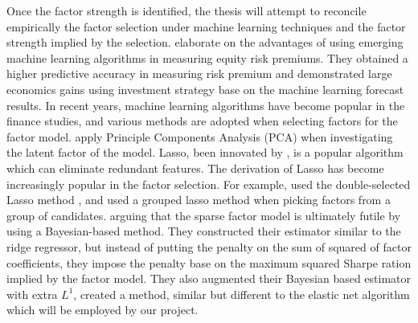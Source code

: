 Once the factor strength is identified, the thesis will attempt to reconcile empirically the factor selection under machine learning techniques and the factor strength implied by the selection.
 elaborate on the advantages of using emerging machine learning algorithms in measuring equity risk premiums.
They obtained a higher predictive accuracy in measuring risk premium and demonstrated large economics gains using investment strategy base on the machine learning forecast results.
In recent years, machine learning algorithms have become popular in the finance studies, and various methods are adopted when selecting factors for the factor model.
 apply Principle Components Analysis (PCA) when investigating the latent factor of the model. 
Lasso, been innovated by , is a popular algorithm which can eliminate redundant features. 
The derivation of Lasso has become increasingly popular in the factor selection.
For example,  used the double-selected Lasso method \cite{Belloni2014}, and  used a grouped lasso method \cite{Huang2010} when picking factors from a group of candidates. 
 arguing that the sparse factor model is ultimately futile by using a Bayesian-based method. 
They constructed their estimator similar to the ridge regressor, but instead of putting the penalty on the sum of squared of factor coefficients, they impose the penalty base on the maximum squared Sharpe ration implied by the factor model.
They also augmented their Bayesian based estimator with extra $L^1$, created a method,  similar but different to the elastic net algorithm which will be employed by our project. 
